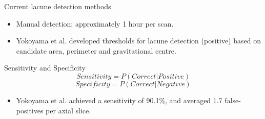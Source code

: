 \documentclass{beamer}
\begin{document}
\begin{frame}{Current lacune detection methods}
    \begin{itemize}
	\item Manual detection: approximately 1 hour per scan.
    \item Yokoyama et al. \cite{Yokoyama2007} developed thresholds for lacune detection (positive) based on candidate area, perimeter and gravitational centre.
    \end{itemize}
    \begin{block}{Sensitivity and Specificity}
	\[
		Sensitivity = P(Correct | Positive)
	\]
	\[
		Specificity = P(Correct | Negative)
	\]
    \end{block}
    \begin{itemize}
    \item Yokoyama et al. \cite{Yokoyama2007} achieved a sensitivity of 90.1\%, and averaged 1.7 false-positives per axial slice.
    \end{itemize}
\end{frame}




\end{document}
